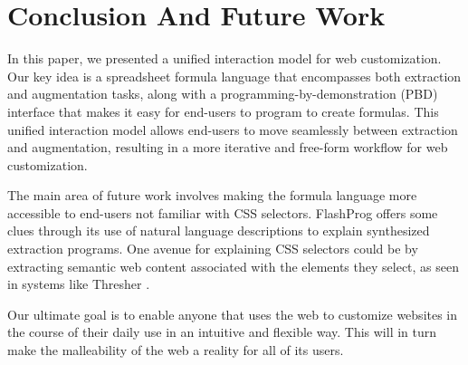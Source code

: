 \documentclass[conference]{IEEEtran}
\begin{document}
\hypertarget{sec:conclusion}{%
\section{Conclusion And Future Work}\label{sec:conclusion}}

In this paper, we presented a unified interaction model for web
customization. Our key idea is a spreadsheet formula language that
encompasses both extraction and augmentation tasks, along with a
programming-by-demonstration (PBD) interface that makes it easy for
end-users to program to create formulas. This unified interaction model
allows end-users to move seamlessly between extraction and augmentation,
resulting in a more iterative and free-form workflow for web
customization.

The main area of future work involves making the formula language more
accessible to end-users not familiar with CSS selectors. FlashProg
offers some clues through its use of natural language descriptions to
explain synthesized extraction programs. One avenue for explaining CSS
selectors could be by extracting semantic web content associated with
the elements they select, as seen in systems like Thresher
\citep{hogue2005}.

Our ultimate goal is to enable anyone that uses the web to customize
websites in the course of their daily use in an intuitive and flexible
way. This will in turn make the malleability of the web a reality for
all of its users.

\newpage





\end{document}
